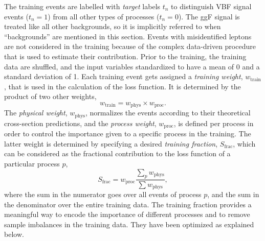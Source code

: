 The training events are labelled with \emph{target} labels $t_n$ to distinguish VBF signal events ($t_n = 1$) from all other types of processes ($t_n = 0$).
The ggF signal is treated like all other backgrounds, so it is implicitly referred to when ``backgrounds'' are mentioned in this section.
Events with misidentified leptons are not considered in the training because of the complex data-driven procedure that is used to estimate their contribution.
Prior to the training, the training data are shuffled, and the input variables standardized to have a mean of 0 and a standard deviation of 1.
Each training event gets assigned a \emph{training weight}, $w_\text{train}$, that is used in the calculation of the loss function. It is determined by the product of two other weights,
\begin{equation}
    w_\text{train} = w_\text{phys} \times w_\text{proc}.
\end{equation}
The \emph{physical weight}, $w_\text{phys}$, normalizes the events according to their theoretical cross-section predictions, and the \emph{process weight}, $w_\text{proc}$, is defined per process in order to control the importance given to a specific process in the training.
The latter weight is determined by specifying a desired \emph{training fraction}, $S_\text{frac}$, which can be considered as the fractional contribution to the loss function of a particular process $p$,
\begin{equation}
    S_\text{frac} = w_\text{proc} \frac{\sum_{p} w_\text{phys}}{ \sum w_\text{phys}},
\end{equation}
where the sum in the numerator goes over all events of process $p$, and the sum in the denominator over the entire training data. The training fraction provides a meaningful way to encode the importance of different processes and to remove sample imbalances in the training data. They have been optimized as explained below.

